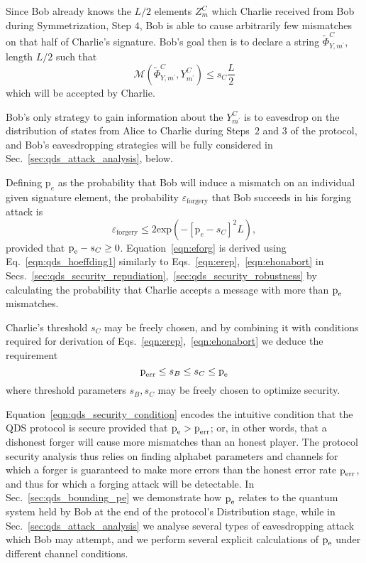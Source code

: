 Since Bob already knows the $L/2$ elements $Z_{m}^C$ which Charlie received from Bob during Symmetrization, Step $4$, Bob is able to cause arbitrarily few mismatches on that half of Charlie's signature. Bob's goal then is to declare a string $\tilde{\Phi}^C_{Y, m^\prime}$, length $L/2$ such that 
\begin{equation}\label{eqn:forging_condition}
\mathcal{M}\left(\tilde{\Phi}^C_{Y, m^\prime}, Y_{m^\prime}^C\right) \le s_C \frac{L}{2}
\end{equation}
which will be accepted by Charlie.

Bob's only strategy to gain information about the $Y_{m^\prime}^C$ is to eavesdrop on the distribution of states from Alice to Charlie during Steps~$2$ and $3$ of the protocol, and Bob's eavesdropping strategies will be fully considered in Sec.~\ref{sec:qds_attack_analysis}, below.

Defining $\text{p}_e$ as the probability that Bob will induce a mismatch on an individual given signature element, the probability $\varepsilon_{\text{forgery}}$ that Bob succeeds in his forging attack is
\begin{equation}\label{eqn:eforg}
\varepsilon_{\text{forgery}} \le 2 \text{exp}\left( - \left[\text{p}_e - s_C\right]^2 L\right), 
\end{equation}
provided that $\text{p}_{\text{e}} - s_C \ge 0$. Equation~\ref{eqn:eforg} is derived using Eq.~\ref{eqn:qds_hoeffding1} similarly to Eqs.~\ref{eqn:erep},~\ref{eqn:ehonabort} in Secs.~\ref{sec:qds_security_repudiation},~\ref{sec:qds_security_robustness} by calculating the probability that Charlie accepts a message with more than $\text{p}_{\text{e}}$ mismatches.

Charlie's threshold $s_C$ may be freely chosen, and by combining it with conditions required for derivation of Eqs.~\ref{eqn:erep},~\ref{eqn:ehonabort} we deduce the requirement
\begin{equation}\label{eqn:qds_security_condition}
\text{p}_{\text{err}} \le s_B \le s_C \le \text{p}_{\text{e}} 
\end{equation}
where threshold parameters $s_B, s_C$ may be freely chosen to optimize security. 

Equation~\ref{eqn:qds_security_condition} encodes the intuitive condition that the QDS protocol is secure provided that $\text{p}_{\text{e}} > \text{p}_{\text{err}}$; or, in other words, that a dishonest forger will cause more mismatches than an honest player. The protocol security analysis thus relies on finding alphabet parameters and channels for which a forger is guaranteed to make more errors than the honest error rate $\text{p}_{\text{err}}$, and thus for which a forging attack will be detectable. In Sec.~\ref{sec:qds_bounding_pe} we demonstrate how $\text{p}_{\text{e}}$ relates to the quantum system held by Bob at the end of the protocol's Distribution stage, while in Sec.~\ref{sec:qds_attack_analysis} we analyse several types of eavesdropping attack which Bob may attempt, and we perform several explicit calculations of $\text{p}_{\text{e}}$ under different channel conditions.

